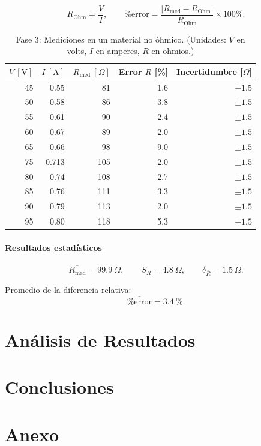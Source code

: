 \documentclass[11pt,twocolumn]{article}
\begin{document}
\[
R_{\mathrm{Ohm}} = \frac{V}{I}, 
\qquad 
\%\mathrm{error} = \frac{|R_{\mathrm{med}} - R_{\mathrm{Ohm}}|}{R_{\mathrm{Ohm}}}\times 100\%.
\]

\begin{table}[h]
\centering
\caption{Fase 3: Mediciones en un material no óhmico. 
(Unidades: $V$ en volts, $I$ en amperes, $R$ en ohmios.)}
\label{tab:fase3}
\begin{tabular}{r r r r r}
\hline
$V\ [\mathrm{V}]$ & $I\ [\mathrm{A}]$ & $R_{\mathrm{med}}\ [\Omega]$ & Error $R$ [\%] & Incertidumbre [\(\Omega\)] \\
\hline
45  & 0.55  & 81  & 1.6   & $\pm 1.5$ \\
50  & 0.58  & 86  & 3.8   & $\pm 1.5$ \\
55  & 0.61  & 90  & 2.4   & $\pm 1.5$ \\
60  & 0.67  & 89  & 2.0   & $\pm 1.5$ \\
65  & 0.66  & 98  & 9.0   & $\pm 1.5$ \\
75  & 0.713 & 105 & 2.0   & $\pm 1.5$ \\
80  & 0.74  & 108 & 2.7   & $\pm 1.5$ \\
85  & 0.76  & 111 & 3.3   & $\pm 1.5$ \\
90  & 0.79  & 113 & 2.0   & $\pm 1.5$ \\
95  & 0.80  & 118 & 5.3   & $\pm 1.5$ \\
\hline
\end{tabular}
\end{table}

\paragraph{Resultados estadísticos}
\[
\overline{R_{\mathrm{med}}} = 99.9\ \Omega,
\qquad
S_{R} = 4.8\ \Omega,
\qquad
\delta_{\overline{R}} = 1.5\ \Omega.
\]

Promedio de la diferencia relativa:
\[
\overline{\%\mathrm{error}} = 3.4\ \%.
\]

\section{Análisis de Resultados}

\section{Conclusiones}

\section{Anexo}
\end{document}
